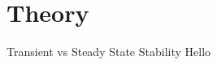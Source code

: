 \section[Theory]{Theory}
\label{sec:lasso_theory}

\begin{frame}[fragile]{Transient vs Steady State Stability}
	Hello
\end{frame}